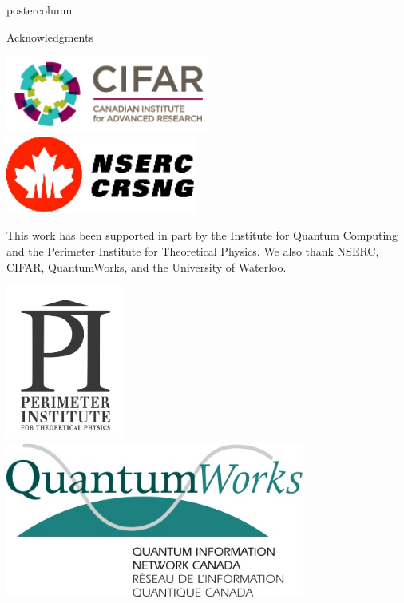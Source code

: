 \documentclass[final]{beamer} %
\begin{document}
\begin{frame}{}
\begin{columns}
\begin{column}{.33\textwidth}
\begin{beamercolorbox}[center,wd=\textwidth]{postercolumn}
\begin{minipage}[c][0.95\textheight][s]{0.95\columnwidth}
\begin{block}{\large Acknowledgments}
\begin{center}
                    \includegraphics[height=1in]{figures/CIFAR_Logo.png} \ \ \includegraphics[height=1in]{figures/NSERC_Logo.png}
                \end{center}
                This work has been supported in part by the Institute for Quantum Computing and the Perimeter Institute for Theoretical Physics. 
                We also thank NSERC, CIFAR, QuantumWorks, and the University of Waterloo.
                \begin{center}
                    \includegraphics[height=2in]{figures/PI_Logo.png} \ \ \includegraphics[height=2in]{figures/QuantumWorks_Logo.png}
                \end{center}
            \end{block}
        \end{minipage}
        \end{beamercolorbox}
        \end{column}
    \end{columns}
    \end{frame}
\end{document}
